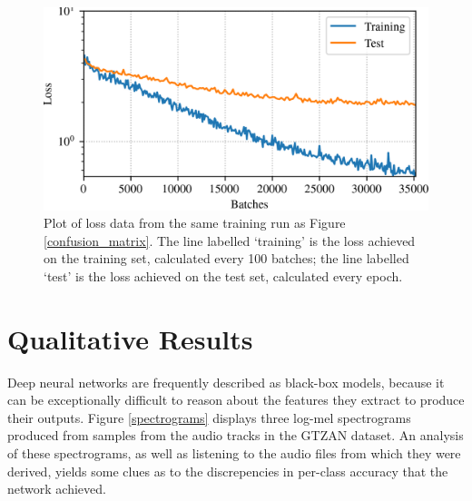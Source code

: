 \documentclass[conference]{IEEEtran}
\begin{document}
\begin{figure}[htbp]
    \centerline{\includegraphics[width=\columnwidth]{loss.png}}
    \caption{
        Plot of loss data from the same training run as Figure \ref{confusion_matrix}.
        The line labelled `training' is the loss achieved on the training set, calculated every 100 batches; the line labelled `test' is the loss achieved on the test set, calculated every epoch.
    }
    \label{loss_curves}
\end{figure}

\section{Qualitative Results}

Deep neural networks are frequently described as black-box models, because it can be exceptionally difficult to reason about the features they extract to produce their outputs.
Figure \ref{spectrograms} displays three log-mel spectrograms produced from samples from the audio tracks in the GTZAN dataset.
An analysis of these spectrograms, as well as listening to the audio files from which they were derived, yields some clues as to the discrepencies in per-class accuracy that the network achieved.
\end{document}
